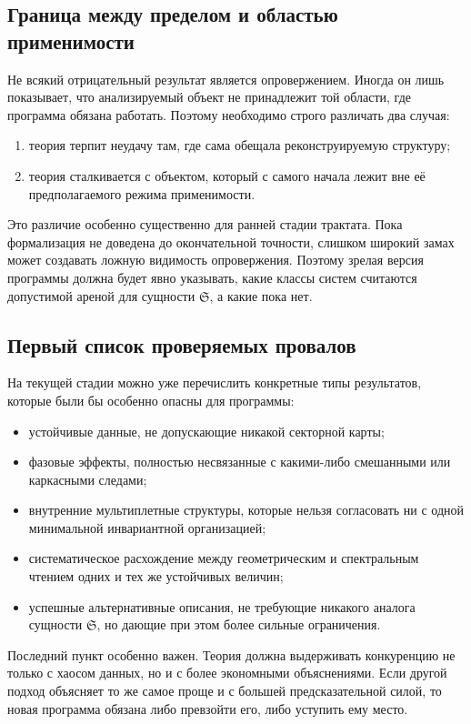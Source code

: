 \documentclass[12pt,a4paper]{article}
\begin{document}
\subsection{Граница между пределом и областью применимости}

Не всякий отрицательный результат является опровержением. Иногда он лишь показывает, что анализируемый объект не принадлежит той области, где программа обязана работать. Поэтому необходимо строго различать два случая:
\begin{enumerate}
    \item теория терпит неудачу там, где сама обещала реконструируемую структуру;
    \item теория сталкивается с объектом, который с самого начала лежит вне её предполагаемого режима применимости.
\end{enumerate}

Это различие особенно существенно для ранней стадии трактата. Пока формализация не доведена до окончательной точности, слишком широкий замах может создавать ложную видимость опровержения. Поэтому зрелая версия программы должна будет явно указывать, какие классы систем считаются допустимой ареной для сущности \(\mathfrak{S}\), а какие пока нет.

\subsection{Первый список проверяемых провалов}

На текущей стадии можно уже перечислить конкретные типы результатов, которые были бы особенно опасны для программы:
\begin{itemize}
    \item устойчивые данные, не допускающие никакой секторной карты;
    \item фазовые эффекты, полностью несвязанные с какими-либо смешанными или каркасными следами;
    \item внутренние мультиплетные структуры, которые нельзя согласовать ни с одной минимальной инвариантной организацией;
    \item систематическое расхождение между геометрическим и спектральным чтением одних и тех же устойчивых величин;
    \item успешные альтернативные описания, не требующие никакого аналога сущности \(\mathfrak{S}\), но дающие при этом более сильные ограничения.
\end{itemize}

Последний пункт особенно важен. Теория должна выдерживать конкуренцию не только с хаосом данных, но и с более экономными объяснениями. Если другой подход объясняет то же самое проще и с большей предсказательной силой, то новая программа обязана либо превзойти его, либо уступить ему место.
\end{document}
